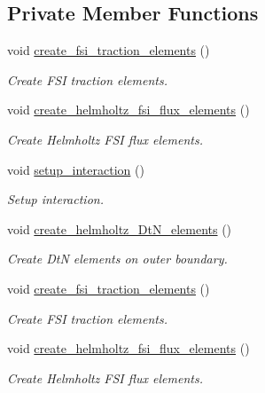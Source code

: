 \subsection*{Private Member Functions}
\begin{DoxyCompactItemize}
\item 
void \hyperlink{classCoatedSphereProblem_a2d342158b3058cd5392e2de3fd7595da}{create\+\_\+fsi\+\_\+traction\+\_\+elements} ()
\begin{DoxyCompactList}\small\item\em Create F\+SI traction elements. \end{DoxyCompactList}\item 
void \hyperlink{classCoatedSphereProblem_a9a301689052eefd53552aadc23ff893b}{create\+\_\+helmholtz\+\_\+fsi\+\_\+flux\+\_\+elements} ()
\begin{DoxyCompactList}\small\item\em Create Helmholtz F\+SI flux elements. \end{DoxyCompactList}\item 
void \hyperlink{classCoatedSphereProblem_aeea43c892871a6c65df992aedc3b3547}{setup\+\_\+interaction} ()
\begin{DoxyCompactList}\small\item\em Setup interaction. \end{DoxyCompactList}\item 
void \hyperlink{classCoatedSphereProblem_a867f4ed706f00a73c87c2c862dcf19c3}{create\+\_\+helmholtz\+\_\+\+Dt\+N\+\_\+elements} ()
\begin{DoxyCompactList}\small\item\em Create DtN elements on outer boundary. \end{DoxyCompactList}\item 
void \hyperlink{classCoatedSphereProblem_a2d342158b3058cd5392e2de3fd7595da}{create\+\_\+fsi\+\_\+traction\+\_\+elements} ()
\begin{DoxyCompactList}\small\item\em Create F\+SI traction elements. \end{DoxyCompactList}\item 
void \hyperlink{classCoatedSphereProblem_a9a301689052eefd53552aadc23ff893b}{create\+\_\+helmholtz\+\_\+fsi\+\_\+flux\+\_\+elements} ()
\begin{DoxyCompactList}\small\item\em Create Helmholtz F\+SI flux elements. \end{DoxyCompactList}\item 

\end{DoxyCompactItemize}

